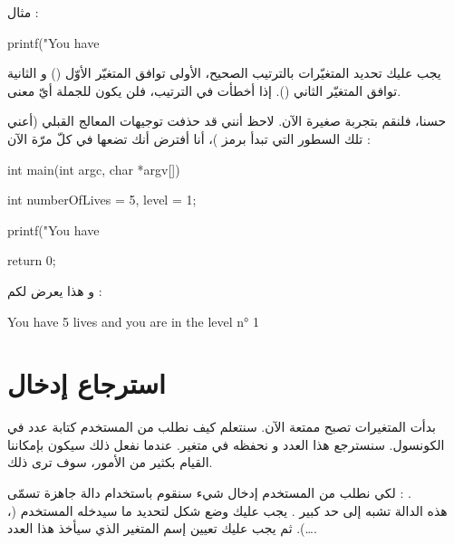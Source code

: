 مثال :
\begin{Csource}
printf("You have %
\end{Csource}
\begin{warning}
  يجب عليك تحديد المتغيّرات بالترتيب الصحيح،
الأولى توافق المتغيّر الأوّل
()
و
الثانية توافق المتغيّر الثاني
().
إذا أخطأت في الترتيب، فلن يكون للجملة أيّ معنى.
\end{warning}
حسنا، فلنقم بتجربة صغيرة الآن. لاحظ أنني قد حذفت توجيهات المعالج القبلي (أعني تلك السطور التي تبدأ برمز
\InlineCode{\#}
)، أنا أفترض أنك تضعها في كلّ مرّة الآن :
\begin{Csource}
int main(int argc, char *argv[])
{
  int numberOfLives = 5, level = 1;

  printf("You have %

  return 0;
}
\end{Csource}
و هذا يعرض لكم :
\begin{Console}
You have 5 lives and you are in the level n° 1
\end{Console}

\section{استرجاع إدخال}
بدأت المتغيرات تصبح ممتعة الآن. سنتعلم كيف نطلب من المستخدم كتابة عدد في الكونسول. سنسترجع هذا العدد و نحفظه في متغير. عندما نفعل ذلك سيكون بإمكاننا القيام بكثير من الأمور، سوف ترى ذلك.

لكي نطلب من المستخدم إدخال شيء سنقوم باستخدام دالة جاهزة تسمّى :
.\\
هذه الدالة تشبه إلى حد كبير
. يجب عليك وضع شكل لتحديد ما سيدخله المستخدم
(،  …).
ثم يجب عليك تعيين إسم المتغير الذي سيأخذ هذا العدد.

